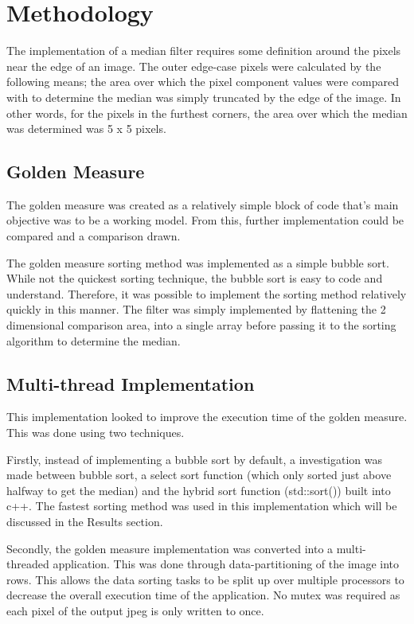 \section{Methodology}
The implementation of a median filter requires some definition around the pixels near the edge of an image. The outer edge-case pixels were calculated by the following means; the area over which the pixel component values were compared with to determine the median was simply truncated by the edge of the image. In other words, for the pixels in the furthest corners, the area over which the median was determined was 5 x 5 pixels.

\subsection{Golden Measure}
The golden measure was created as a relatively simple block of code that's main objective was to be a working model. From this, further implementation could be compared and a comparison drawn.

The golden measure sorting method was implemented as a simple bubble sort. While not the quickest sorting technique, the bubble sort is easy to code and understand. Therefore, it was possible to implement the sorting method relatively quickly in this manner. The filter was simply implemented by flattening the 2 dimensional comparison area, into a single array before passing it to the sorting algorithm to determine the median.

\subsection{Multi-thread Implementation}
This implementation looked to improve the execution time of the golden measure. This was done using two techniques. 

Firstly, instead of implementing a bubble sort by default, a investigation was made between bubble sort, a select sort function (which only sorted just above halfway to get the median) and the hybrid sort function (std::sort()) built into c++. The fastest sorting method was used in this implementation which will be discussed in the Results section.

Secondly, the golden measure implementation was converted into a multi-threaded application. This was done through data-partitioning of the image into rows. This allows the data sorting tasks to be split up over multiple processors to decrease the overall execution time of the application. No mutex was required as each pixel of the output jpeg is only written to once.
  
